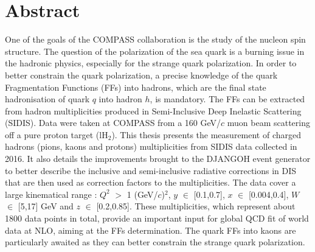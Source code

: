 


\begingroup
\let\clearpage\relax
\let\cleardoublepage\relax
\let\cleardoublepage\relax

\chapter*{Abstract}

One of the goals of the COMPASS collaboration is the study of the nucleon spin structure. The question of the polarization of the sea quark is a burning issue in the hadronic physics, especially for the strange quark polarization. In order to better constrain the quark polarization, a precise knowledge of the quark Fragmentation Functions (FFs) into hadrons, which are the final state hadronisation of quark $q$ into hadron $h$, is mandatory. The FFs can be extracted from hadron multiplicities produced in Semi-Inclusive Deep Inelastic Scattering (SIDIS). Data were taken at COMPASS from a 160 GeV/$c$ muon beam scattering off a pure proton target (lH$_2$). This thesis presents the measurement of charged hadrons (pions, kaons and protons) multiplicities from SIDIS data collected in 2016. It also details the improvements brought to the DJANGOH event generator to better describe the inclusive and semi-inclusive radiative corrections in DIS that are then used as correction factors to the multiplicities. The data cover a large kinematical range : $Q^2$ $>$ 1 (GeV/$c$)$^2$, $y$ $\in$ [0.1,0.7], $x$ $\in$ [0.004,0.4], $W$ $\in$ [5,17] GeV and $z$ $\in$ [0.2,0.85]. These multiplicities, which represent about 1800 data points in total, provide an important input for global QCD fit of world data at NLO, aiming at the FFs determination. The quark FFs into kaons are particularly awaited as they can better constrain the strange quark polarization.

\vspace{2cm}

